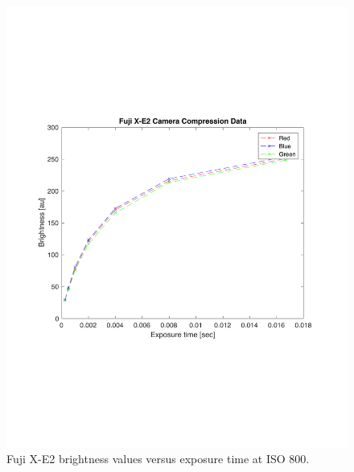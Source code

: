 \documentclass[a4paper]{article}
\begin{document}
\begin{figure}[htb!]
    \begin{center}
        \includegraphics[width=6 in]{Ecal.pdf}
	 \end{center}
    \caption{Fuji X-E2 brightness values versus exposure time at ISO 800.} 
    \label{fig:Ecal}
\end{figure}
\end{document}
